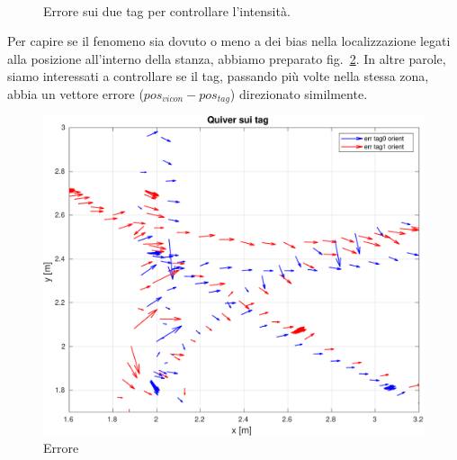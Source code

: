 \begin{figure}[h]
	\centering
	\\
	\caption{Errore sui due tag per controllare l'intensit\`a.}
	\label{fig: confronto uwbvicon tag errore sigma}
\end{figure}


Per capire se il fenomeno sia dovuto o meno a dei bias nella localizzazione legati alla posizione all'interno della stanza, abbiamo preparato fig.~\ref{fig: uwbvicon_quiver_err}. 
In altre parole, siamo interessati a controllare se il tag, passando pi\`u volte nella stessa zona, abbia un vettore errore ($ pos_{vicon} - pos_{tag}$) direzionato similmente. 

\begin{figure}[h]
	\centering
	\includegraphics[height=0.25\textheight]{figs/grafici_uwbvicon/uwbvicon_quiver_err.pdf}
	\caption{Errore}
	\label{fig: uwbvicon_quiver_err}
\end{figure}

